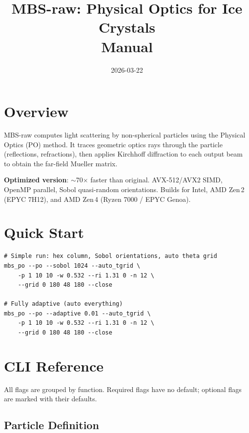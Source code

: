 \documentclass[11pt,a4paper]{article}
\title{\textbf{MBS-raw: Physical Optics for Ice Crystals}\\[4pt]\large Manual}
\author{}
\date{2026-03-22}
\begin{document}
\maketitle
\tableofcontents
\newpage

\section{Overview}

MBS-raw computes light scattering by non-spherical particles using the Physical Optics (PO) method.
It traces geometric optics rays through the particle (reflections, refractions),
then applies Kirchhoff diffraction to each output beam to obtain the far-field Mueller matrix.

\textbf{Optimized version}: $\sim$70$\times$ faster than original. AVX-512/AVX2 SIMD, OpenMP parallel,
Sobol quasi-random orientations. Builds for Intel, AMD Zen\,2 (EPYC 7H12), and AMD Zen\,4 (Ryzen 7000 / EPYC Genoa).

\section{Quick Start}

\begin{lstlisting}
# Simple run: hex column, Sobol orientations, auto theta grid
mbs_po --po --sobol 1024 --auto_tgrid \
    -p 1 10 10 -w 0.532 --ri 1.31 0 -n 12 \
    --grid 0 180 48 180 --close

# Fully adaptive (auto everything)
mbs_po --po --adaptive 0.01 --auto_tgrid \
    -p 1 10 10 -w 0.532 --ri 1.31 0 -n 12 \
    --grid 0 180 48 180 --close
\end{lstlisting}

\section{CLI Reference}

All flags are grouped by function. Required flags have no default; optional flags are marked with their defaults.

\subsection{Particle Definition}
\end{document}
